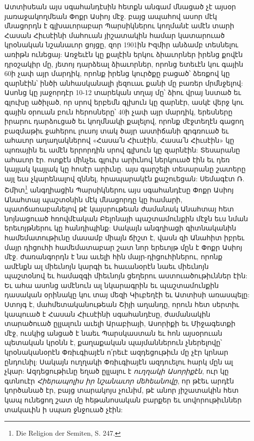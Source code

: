 \documentclass{article}
\begin{document}
{Ատտիսեան այս սգահանդէսին հետքն անգամ մնացած չէ այսօր յառաջակողմեան Փոքր Ասիոյ մէջ. բայց ապահով ասոր մէկ մնացորդն է գլխաւորաբար Պարսիկներու կողմանէ ամէն տարի Հասան Հիւսէինի մահուան յիշատակին համար կատարուած կրօնական նշանաւոր ցոյցը, զոր 1901ին Իզմիր անձամբ տեսնելու առիթն ունեցայ: Առջեւէն կը քալէին երկու ձիաւորներ իրենց քովէն դրօշակիր մը, յետոյ դարձեալ ձիաւորներ, որոնց ետեւէն կու գային 60ի չափ այր մարդիկ, որոնք իրենց կուրծքը բացած՝ ձեռքով կը զարնէին՝ ինծի անհասկանալի լեզուաւ քանի մը բառեր մրմնջելով: Ասոնց կը յաջորդէր 10-12 տարեկան տղայ մը՝ ձիու վրայ նստած եւ գլուխը ածիլած, որ սրով երբեմն գլխուն կը զարնէր, ասկէ վերջ կու գային օրուան բուն հերոսները՝ 40ի չափ այր մարդիկ, երեսները իրարու դարձուցած եւ կողմնակի քալելով, որոնք մէջտեղէն գացող բազմաթիւ ջահերու լուսոյ տակ ծայր աստիճանի գրգռուած եւ ահաւոր աղաղակներով «Հասա՛ն Հիւսէին, Հասա՛ն Հիւսէին» կը պոռային եւ ամէն երրորդին սրով գլխուն կը զարնէին: Տեսարանը ահաւոր էր. ոտքէն մինչեւ գլուխ արիւնով ներկուած էին եւ դեռ կայլակ կայլակ կը հոսէր արիւնը. այս գարշելի տեսարանը շատերը այլ եւս չկարենալով զննել, հրապարակէն քաշուեցան: Սեմագէտ Ռ. Շմիտ\footnote{Die Religion der Semiten, S. 247.} անգղիացին Պարսիկներու այս սգահանդէսը Փոքր Ասիոյ Անահտայ պաշտօնին մէկ մնացորդը կը համարի, պատճառաբանելով թէ կայսրութեան ժամանակ Անահտայ հետ նոյնացուած հռովմէական Բելոնայի պաշտամունքին մէջն եւս նման երեւոյթներու կը հանդիպինք: Սակայն անգղիացի գիտնականին համեմատութիւնը մասամբ միայն ճիշտ է, վասն զի Անահիտ իբրեւ մայր դիցուհի համեմատաբար շատ նոր երեւոյթ մըն է Փոքր Ասիոյ մէջ. ժառանգորդն է նա աւելի հին մայր-դիցուհիներու, որոնք ամէնքն ալ միեւնոյն կարգի եւ հաւանօրէն նաեւ միեւնոյն պաշտօնով եւ համազգի միեւնոյն ցեղերու աստուածութիւններ էին: Եւ ահա ասոնց ամէնուն ալ նկարագրին եւ պաշտամունքին դասական օրինակը կու տայ մեզի Կիւբեղէի եւ Ատտիսի առասպելը: Ստոյգ է, մահմետականութեան Շիյի աղանդը, որուն հետ սերտիւ կապուած է Հասան Հիւսէինի սգահանդէսը, ժամանակին տարածուած ըլլալուն աւելի Արաբիայի, Ասորիքի եւ Միջագետքի մէջ, ուսկից անցած է նաեւ Պարսկաստան եւ հոն այսօրուան պետական կրօնն է, քաղաքական պայմաններուն չներելովը՝ կրօնականօրէն Փռիւգիայէն ո՛րեւէ ազդեցութիւն մը չէր կրնար ընդունիլ: Սակայն ուղղակի Փռիւգիայէն ազդուելու հարկ մըն ալ չկար: Ազդեցութիւնը եղած ըլլալու է \emph{ուղղակի Ասորիքէն}, ուր կը գտնուէր \emph{Հիերապոլիս իր նշանաւոր մեհեանովը}, որ թէեւ արդէն կործանած էր, բայց տարակոյս չունիմ, թէ անոր յիշատակին հետ կապ ունեցող շատ մը հեթանոսական բարքեր եւ սովորութիւններ տակաւին ի սպառ ջնջուած չէին:

}
\end{document}
